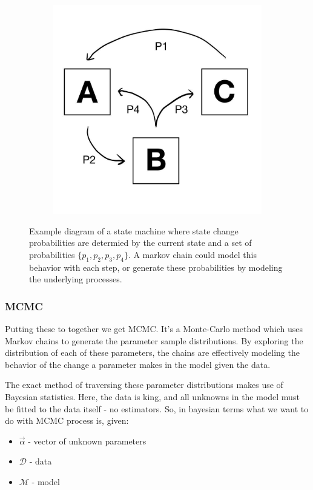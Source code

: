 \documentclass [letterpaper, 12pt] {article}
\begin{document}
\begin{figure}[H]
	\centering
	\begin{subfigure}{0.5\textwidth}
		\includegraphics[width=\textwidth]{state_machine.jpg}
	\end{subfigure}
	\caption{Example diagram of a state machine where state change probabilities are determied by the current state and a set of probabilities $\{p_1, p_2, p_3, p_4\}$. A markov chain could model this behavior with each step, or generate these probabilities by modeling the underlying processes.}
\end{figure}

\subsubsection{MCMC}

Putting these to together we get MCMC. It's a Monte-Carlo method which uses Markov chains to generate the parameter sample distributions. By exploring the distribution of each of these parameters, the chains are effectively modeling the behavior of the change a parameter makes in the model given the data.

The exact method of traversing these parameter distributions makes use of Bayesian statistics. Here, the data is king, and all unknowns in the model must be fitted to the data itself - no estimators. So, in bayesian terms what we want to do with MCMC process is, given:
\begin{itemize}
	\item $\vec{\alpha}$ - vector of unknown parameters
	\item $\mathcal{D}$ - data
	\item $\mathcal{M}$ - model
\end{itemize}
\end{document}
